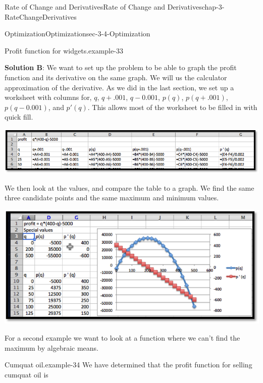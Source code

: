 \documentclass[oneside,10pt,]{book}
\newcommand{\terminology}[1]{\textbf{#1}}
\numberwithin{equation}{section}
\begin{document}
\begin{chapterptx}{Rate of Change and Derivatives}{}{Rate of Change and Derivatives}{}{}{chap-3-RateChangeDerivatives}
\begin{sectionptx}{Optimization}{}{Optimization}{}{}{sec-3-4-Optimization}
\begin{example}{Profit function for widgets.}{example-33}
\par
\hypertarget{p-1207}{}%
\terminology{Solution B}:  We want to set up the problem to be able to graph the profit function and its derivative on the same graph.  We will us the calculator approximation of the derivative.  As we did in the last section, we set up a worksheet with columns for, \(q\), \(q+.001\), \(q-0.001\), \(p(q)\), \(p(q+.001)\), \(p(q-0.001)\), and \(p'(q)\).  This allows most of the worksheet to be filled in with quick fill.%
\begin{sidebyside}{1}{0}{0}{0}%
\begin{sbspanel}{1}%
\includegraphics[width=1\linewidth]{images/sec3-4-1.png}
\end{sbspanel}%
\end{sidebyside}%
\par
\hypertarget{p-1208}{}%
We then look at the values, and compare the table to a graph.  We find the same three candidate points and the same maximum and minimum values.%
\begin{sidebyside}{1}{0.1}{0.1}{0}%
\begin{sbspanel}{0.8}%
\includegraphics[width=1\linewidth]{images/sec3-4-2.png}
\end{sbspanel}%
\end{sidebyside}%
\end{example}
\hypertarget{p-1209}{}%
For a second example we want to look at a function where we can’t find the maximum by algebraic means.%
\begin{example}{Cumquat oil.}{example-34}%
\hypertarget{p-1210}{}%
We have determined that the profit function for selling cumquat oil is%
%
\begin{equation*}

\end{equation*}
\end{example}
\end{sectionptx}
\end{chapterptx}
\end{document}

